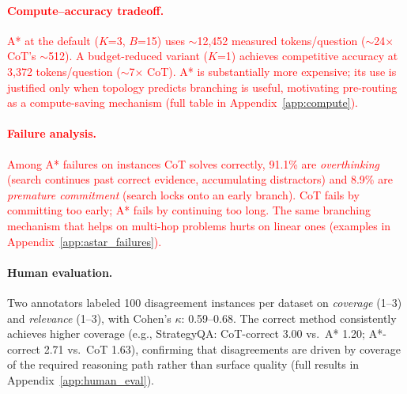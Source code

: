 \documentclass[11pt]{article}
\begin{document}
\textcolor{red}{\paragraph{Compute--accuracy tradeoff.}
A* at the default ($K$=3, $B$=15) uses $\sim$12,452 measured tokens/question ($\sim$24$\times$ CoT's $\sim$512). A budget-reduced variant ($K$=1) achieves competitive accuracy at 3,372 tokens/question ($\sim$7$\times$ CoT). A* is substantially more expensive; its use is justified only when topology predicts branching is useful, motivating pre-routing as a compute-saving mechanism (full table in Appendix~\ref{app:compute}).}

\textcolor{red}{\paragraph{Failure analysis.}
Among A* failures on instances CoT solves correctly, 91.1\% are \emph{overthinking} (search continues past correct evidence, accumulating distractors) and 8.9\% are \emph{premature commitment} (search locks onto an early branch). CoT fails by committing too early; A* fails by continuing too long. The same branching mechanism that helps on multi-hop problems hurts on linear ones (examples in Appendix~\ref{app:astar_failures}).}

\paragraph{Human evaluation.}
Two annotators labeled 100 disagreement instances per dataset on \emph{coverage} (1--3) and \emph{relevance} (1--3), with Cohen's $\kappa$: 0.59--0.68. The correct method consistently achieves higher coverage (e.g., StrategyQA: CoT-correct 3.00 vs.\ A* 1.20; A*-correct 2.71 vs.\ CoT 1.63), confirming that disagreements are driven by coverage of the required reasoning path rather than surface quality (full results in Appendix~\ref{app:human_eval}).





\end{document}
